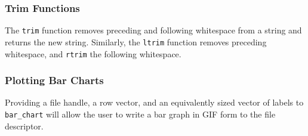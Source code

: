 		\subsubsection{Trim Functions}
		The \texttt{trim} function removes preceding and following whitespace from a string and returns the new string. Similarly, the \texttt{ltrim} function removes preceding whitespace, and \texttt{rtrim} the following whitespace.

		\subsubsection{Plotting Bar Charts}
		Providing a file handle, a row vector, and an equivalently sized vector of labels to \texttt{bar\_chart} will allow the user to write a bar graph in GIF form to the file descriptor.
